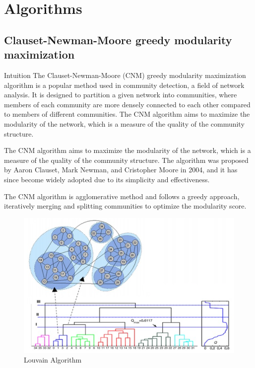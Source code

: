\section{Algorithms}
\subsection{Clauset-Newman-Moore greedy modularity maximization}
\begin{frame}[fragile]{Intuition}
The Clauset-Newman-Moore (CNM) greedy modularity maximization algorithm is a popular method used in community detection, a field of network analysis. It is designed to partition a given network into communities, where members of each community are more densely connected to each other compared to members of different communities. The CNM algorithm aims to maximize the modularity of the network, which is a measure of the quality of the community structure.

The CNM algorithm aims to maximize the modularity of the network, which is a measure of the quality of the community structure. The algorithm was proposed by Aaron Clauset, Mark Newman, and Cristopher Moore in 2004, and it has since become widely adopted due to its simplicity and effectiveness.

The CNM algorithm is agglomerative method and follows a greedy approach, iteratively merging and splitting communities to optimize the modularity score.

\begin{center}
    \begin{figure}[!htp]
    \centering
    \includegraphics[width=0.7 \textwidth]{CNM.png}
    \caption{Louvain Algorithm}
    \label{subsection}
\end{figure}
\end{center}
\end{frame}

